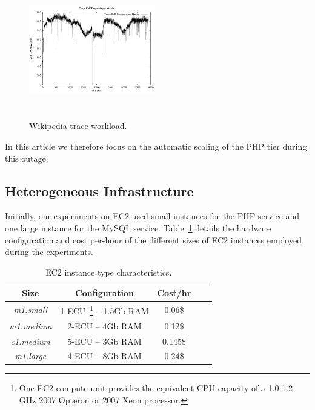 \begin{figure}
\begin{center}
\includegraphics[width=0.49\textwidth, height=6cm]{./images/traceWorkload2011}
\end{center}
\vspace{-5mm}
\caption{Wikipedia trace workload.}
\label{workload}
\end{figure}


In this article we therefore focus on the automatic scaling of the PHP tier during this outage.

\subsection{Heterogeneous Infrastructure}

Initially, our experiments on EC2 used small instances for the PHP service and one large instance for the MySQL service. Table~\ref{EC2instances} details the hardware configuration and cost per-hour of the different sizes of EC2 instances employed during the experiments.

\begin{table}
  {\scriptsize 
\begin{center}
    \begin{tabular}{  | c | c | c | c | c |}
    \hline
      \textbf{Size}  & \textbf{Configuration} & \textbf{Cost/hr} \\ \hline
   \textit{m1.small}   & 1-ECU~\footnote{One EC2 compute unit provides the equivalent CPU capacity of a 1.0-1.2 GHz 2007 Opteron or 2007 Xeon processor.}  -- 1.5Gb RAM&  0.06\$ \\ \hline
   \textit{m1.medium}   & 2-ECU -- 4Gb RAM&  0.12\$ \\ \hline
\textit{c1.medium} & 5-ECU -- 3Gb RAM& 0.145\$   \\ \hline
\textit{m1.large} & 4-ECU -- 8Gb RAM& 0.24\$   \\ \hline
 \end{tabular}
\end{center}
\vspace{-5mm}
\caption{EC2 instance type characteristics.}
\label{EC2instances}
}
\end{table}


